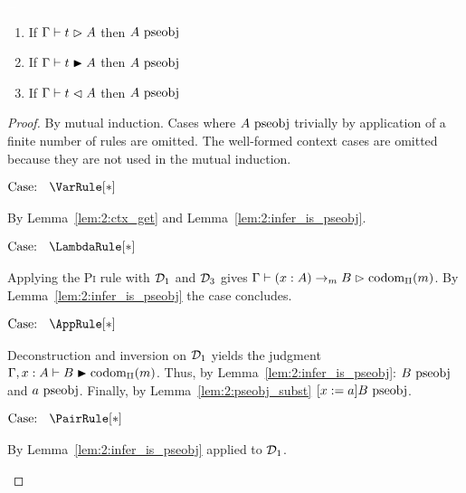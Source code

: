 \begin{lemma}
    \textcolor{white}{\_}
    \begin{enumerate}
        \item If $\Gamma \vdash t \vartriangleright A$ then $A~\mbox{\normalfont pseobj}$
        \item If $\Gamma \vdash t \blacktriangleright A$ then $A~\mbox{\normalfont pseobj}$
        \item If $\Gamma \vdash t \vartriangleleft A$ then $A~\mbox{\normalfont pseobj}$
    \end{enumerate}
    \label{lem:2:infer_type_is_pseobj}
\end{lemma}
\begin{proof}
    By mutual induction.
    Cases where $A~\mbox{\normalfont pseobj}$ trivially by application of a finite number of rules are omitted.
    The well-formed context cases are omitted because they are not used in the mutual induction.

    $\text{Case: }\begin{array}{c} \VarRule[*] \end{array}$
    \begin{proofcase}
        By Lemma~\ref{lem:2:ctx_get} and Lemma~\ref{lem:2:infer_is_pseobj}.
    \end{proofcase}

    $\text{Case: }\begin{array}{c} \LambdaRule[*] \end{array}$
    \begin{proofcase}
        Applying the \textsc{Pi} rule with $\mathcal{D}_{1}$ and $\mathcal{D}_{3}$ gives $\Gamma \vdash (x : A) \to_m B \vartriangleright \mbox{\normalfont codom}_\Pi(m)$.
        By Lemma~\ref{lem:2:infer_is_pseobj} the case concludes.
    \end{proofcase}

    $\text{Case: }\begin{array}{c} \AppRule[*] \end{array}$
    \begin{proofcase}
        Deconstruction and inversion on $\mathcal{D}_{1}$ yields the judgment $\Gamma, x : A \vdash B \blacktriangleright \mbox{\normalfont codom}_\Pi(m)$.
        Thus, by Lemma~\ref{lem:2:infer_is_pseobj}: $B~\mbox{\normalfont pseobj}$ and $a~\mbox{\normalfont pseobj}$.
        Finally, by Lemma~\ref{lem:2:pseobj_subst} $[x := a]B~\mbox{\normalfont pseobj}$.
    \end{proofcase}

    $\text{Case: }\begin{array}{c} \PairRule[*] \end{array}$
    \begin{proofcase}
        By Lemma~\ref{lem:2:infer_is_pseobj} applied to $\mathcal{D}_{1}$.
    \end{proofcase}


\end{proof}
